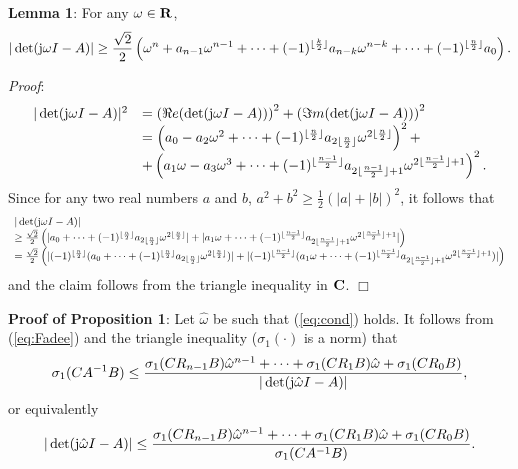 \bigskip
\noindent
{\bf Lemma 1}: For any $\omega \in {\bf R}$,
\[
|\det({\rm j}\omega I -A)|
 \geq 
\frac{\sqrt2}{2}\left( \omega^n+a_{n-1}\omega^{n-1}+\cdots+(-1)^
{\lfloor \frac{k}{2} \rfloor}a_{n-k}\omega^{n-k}+\cdots+
(-1)^{\lfloor \frac{n}{2} \rfloor}a_0 \right).
\]

\noindent
{\it Proof}:
\[
\begin{array}{lll}
 |\det({\rm j}\omega I-A)|^2
&= \left( \Re e(\det({\rm j}\omega I-A)) \right) ^2
 + \left( \Im m(\det({\rm j}\omega I-A)) \right) ^2  \\
& = \left( a_0-a_2\omega^2+\cdots+(-1)^{\lfloor \frac{n}{2} \rfloor}
         a_{2\lfloor \frac{n}{2} \rfloor} \omega^{2\lfloor \frac{n}{2} 
         \rfloor} \right) ^2+  \\
& + \left( a_1 \omega-a_3\omega^3+\cdots+(-1)^{ \lfloor \frac{n-1}{2} \rfloor}
     a_{2 \lfloor \frac{n-1}{2} \rfloor +1} \omega^{2 \lfloor \frac{n-1}{2}
    \rfloor +1} \right) ^2.
\end{array}
\]
Since for any two real numbers $a$ and $b$, 
$a^2+b^2 \geq \frac{1}{2}(|a|+|b|)^2$, it follows that
\[ 
\begin{array}{l}
|\det({\rm j}\omega I-A)|    \\
 \geq  \frac{\sqrt2}{2} 
   \left( |a_0+\cdots+(-1)^{\lfloor \frac{n}{2} \rfloor}
         a_{2\lfloor \frac{n}{2} \rfloor} \omega^{2\lfloor \frac{n}{2} 
         \rfloor}|+|a_1 \omega+\cdots+(-1)^{ \lfloor \frac{n-1}{2} \rfloor}
     a_{2 \lfloor \frac{n-1}{2} \rfloor +1} \omega^{2 \lfloor \frac{n-1}{2}
    \rfloor +1}| \right)  \\
 = \frac{\sqrt2}{2}
   \left( |(-1)^{\lfloor \frac{n}{2} \rfloor} ( a_0+
    \cdots+(-1)^{\lfloor \frac{n}{2} \rfloor}
         a_{2\lfloor\frac{n}{2}\rfloor}\omega^{2\lfloor \frac{n}{2} 
         \rfloor})| 
+|(-1)^{\lfloor \frac{n-1}{2} \rfloor} ( a_1 \omega+
   \cdots+(-1)^{ \lfloor \frac{n-1}{2} \rfloor}
     a_{2 \lfloor \frac{n-1}{2} \rfloor +1} \omega^{2 \lfloor \frac{n-1}{2}
    \rfloor +1} ) | \right)
\end{array}
\]
and the claim follows from the triangle inequality in ${\bf C}$.
  \hfill   $\Box$

\bigskip\noindent
{\bf Proof of Proposition 1}: Let $\hat{\omega}$ be such that (\ref{eq:cond})
holds. It follows from (\ref{eq:Fadee}) and the triangle inequality ($\sigma_1
(\cdot)$ is a norm) that 
\begin{equation}
\sigma_1(CA^{-1}B)  \leq 
\frac{\sigma_1(CR_{n-1}B) \hat{\omega}^{n-1}+
\cdots+\sigma_1(CR_1B) \hat{\omega}+\sigma_1(CR_0B)}
{|\det({\rm j}\hat{\omega} I-A)|},
\label{eq:INV}
\end{equation}
or equivalently
\begin{eqnarray}
|\det({\rm j}\hat{\omega} I-A)|
\leq 
\frac{\sigma_1(CR_{n-1}B) \hat{\omega}^{n-1}+
\cdots+\sigma_1(CR_1B) \hat{\omega}+\sigma_1(CR_0B)}
{\sigma_1(CA^{-1}B)}.
\label{eq:INV2}
\end{eqnarray}


